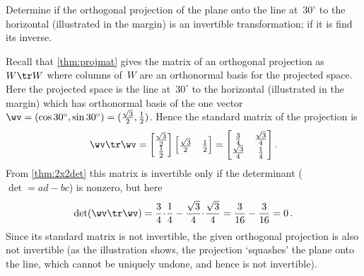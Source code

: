 \begin{example} \label{eg:}
Determine if the orthogonal projection of the plane onto the line at~\(30^\circ\) to the horizontal (illustrated in the margin) is an invertible transformation; if it is find its inverse.
%
\begin{solution} 
Recall that \autoref{thm:projmat} gives the matrix of an orthogonal projection as~\(W\tr W\) where columns of~\(W\) are an orthonormal basis for the projected space.
Here the projected space is the line at~\(30^\circ\) to the horizontal (illustrated in the margin) which has orthonormal basis of the one vector \(\wv=(\cos 30^\circ,\sin 30^\circ)=(\tfrac{\sqrt3}2,\tfrac12)\).
Hence the standard matrix of the projection is
\begin{equation*}
\wv\tr\wv=\begin{bmatrix} \tfrac{\sqrt3}2\\\tfrac12 \end{bmatrix}
\begin{bmatrix} \tfrac{\sqrt3}2&\tfrac12 \end{bmatrix}
=\begin{bmatrix} \tfrac34&\tfrac{\sqrt3}4\\
\tfrac{\sqrt3}4&\tfrac14 \end{bmatrix}.
\end{equation*}
From \autoref{thm:2x2det} this matrix is invertible only if the determinant (\(\det=ad-bc\)) is nonzero, but here
\begin{equation*}
\det(\wv\tr\wv)=\frac34\cdot\frac14-\frac{\sqrt3}4\cdot\frac{\sqrt3}4
=\frac3{16}-\frac3{16}=0\,.
\end{equation*}
Since its standard matrix is not invertible, the given orthogonal projection is also not invertible (as the illustration shows, the projection `squashes' the plane onto the line, which cannot be uniquely undone, and hence is not invertible).
\end{solution}
\end{example}







%



